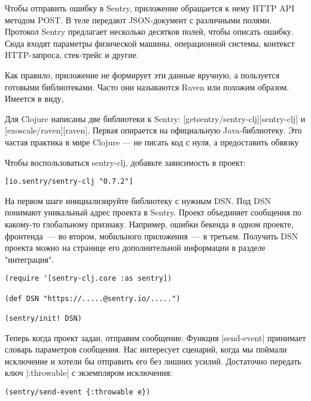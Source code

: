 Чтобы отправить ошибку в Sentry, приложение обращается к нему HTTP API методом
POST. В теле передают JSON-документ с различными полями. Протокол Sentry
предлагает несколько десятков полей, чтобы описать ошибку. Сюда входят параметры
физической машины, операционной системы, контекст HTTP-запроса, стек-трейс и
другие.

Как правило, приложение не формирует эти данные вручную, а пользуется готовыми
библиотеками. Часто они называются Raven или похожим образом. Имеется в виду,


Для Clojure написаны две библиотеки к Sentry: [getsentry/sentry-clj][sentry-clj]
и [exoscale/raven][raven]. Первая опирается на официальную Java-библиотеку. Это
частая практика в мире Clojure — не писать код с нуля, а предоставить обвязку

Чтобы воспользоваться sentry-clj, добавьте зависимость в проект:

\begin{verbatim}
[io.sentry/sentry-clj "0.7.2"]
\end{verbatim}

На первом шаге инициализируйте библиотеку с нужным DSN. Под DSN понимают
уникальный адрес проекта в Sentry. Проект объединяет сообщения по какому-то
глобальному признаку. Например, ошибки бекенда в одном проекте, фронтенда~--- во
втором, мобильного приложения~--- в третьем. Получить DSN проекта можно на
странице его дополнительной информации в разделе "интеграция".

\begin{verbatim}
(require '[sentry-clj.core :as sentry])

(def DSN "https://.....@sentry.io/.....")

(sentry/init! DSN)
\end{verbatim}

Теперь когда проект задан, отправим сообщение. Функция \spverb|send-event| принимает
словарь параметров сообщения. Нас интересует сценарий, когда мы поймали
исключение и хотели бы отправить его без лишних усилий. Достаточно передать ключ
\spverb|:throwable| с экземпляром исключения:

\begin{verbatim}
(sentry/send-event {:throwable e})
\end{verbatim}

